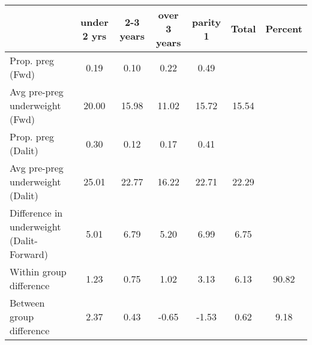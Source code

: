 \begin{tabular}{l*{6}{c}}
\toprule
            &\multicolumn{1}{c}{under 2 yrs}&\multicolumn{1}{c}{2-3 years}&\multicolumn{1}{c}{over 3 years}&\multicolumn{1}{c}{parity 1}&\multicolumn{1}{c}{Total}&\multicolumn{1}{c}{Percent}\\
\midrule
\midrule
Prop. preg (Fwd)&        0.19&        0.10&        0.22&        0.49&            &            \\
Avg pre-preg underweight (Fwd)&       20.00&       15.98&       11.02&       15.72&       15.54&            \\
Prop. preg (Dalit)&        0.30&        0.12&        0.17&        0.41&            &            \\
Avg pre-preg underweight (Dalit)&       25.01&       22.77&       16.22&       22.71&       22.29&            \\
Difference in underweight (Dalit-Forward)&        5.01&        6.79&        5.20&        6.99&        6.75&            \\
Within group difference&        1.23&        0.75&        1.02&        3.13&        6.13&       90.82\\
Between group difference&        2.37&        0.43&       -0.65&       -1.53&        0.62&        9.18\\
\bottomrule
\end{tabular}
